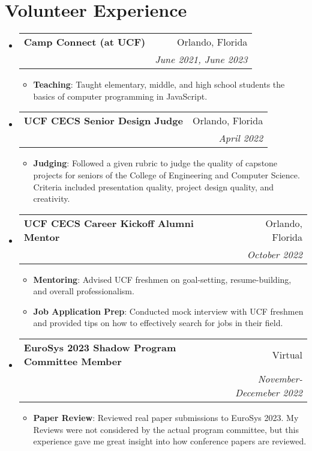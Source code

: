 \documentclass[a4paper,20pt]{article}
\makeatletter
\newcommand{\resumeItem}[2]{
  \item\small{
    \textbf{#1}{: #2 \vspace{-2pt}}
  }
}
\newcommand{\resumeSubheading}[4]{
  \vspace{-1pt}\item
    \begin{tabular*}{0.97\textwidth}{l@{\extracolsep{\fill}}r}
      \textbf{#1} & #2 \\
      \textit{#3} & \textit{#4} \\
    \end{tabular*}\vspace{-5pt}
}
\newcommand{\resumeSubHeadingListStart}{\begin{itemize}[leftmargin=*]}
\newcommand{\resumeSubHeadingListEnd}{\end{itemize}}
\newcommand{\resumeItemListStart}{\begin{itemize}}
\newcommand{\resumeItemListEnd}{\end{itemize}\vspace{-5pt}}
\makeatother
\begin{document}
\vspace{-5pt}
\section{Volunteer Experience}
\resumeSubHeadingListStart
\resumeSubheading
{Camp Connect (at UCF)}
{Orlando, Florida}
{}
{June 2021, June 2023}
\resumeItemListStart
\resumeItem
{Teaching}
{Taught elementary, middle, and high school students the basics of computer
programming in JavaScript.}
\resumeItemListEnd

\vspace{2pt}
\resumeSubheading
{UCF CECS Senior Design Judge}
{Orlando, Florida}
{}
{April 2022}
\resumeItemListStart
\resumeItem
{Judging}
{Followed a given rubric to judge the quality of capstone projects for seniors of the College of Engineering and Computer Science.
  Criteria included presentation quality, project design quality, and creativity.}
\resumeItemListEnd

\vspace{2pt}
\resumeSubheading
{UCF CECS Career Kickoff Alumni Mentor}
{Orlando, Florida}
{}
{October 2022}
\resumeItemListStart
\resumeItem
{Mentoring}
{Advised UCF freshmen on goal-setting, resume-building, and overall professionalism.}
\resumeItem
{Job Application Prep}
{Conducted mock interview with UCF freshmen and provided tips on how to effectively search for jobs in their field.}
\resumeItemListEnd

\vspace{2pt}
\resumeSubheading
{EuroSys 2023 Shadow Program Committee Member}
{Virtual}
{}
{November-Decemeber 2022}
\resumeItemListStart
\resumeItem
{Paper Review}
{Reviewed real paper submissions to EuroSys 2023.
My Reviews were not considered by the actual program committee, but this experience gave me great insight into how conference papers are reviewed.}
\resumeItemListEnd

\resumeSubHeadingListEnd
\end{document}
